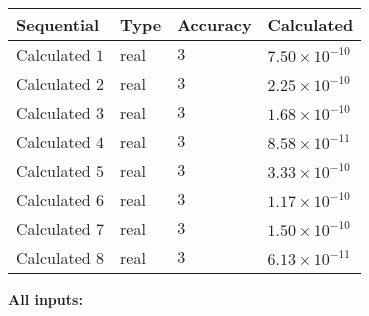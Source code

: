 \documentclass[12pt]{article}
\begin{document}
   
   
   
\noindent{}
   
   
  
  
\noindent\begin{tabular}{|l|l|l|l|}
\hline
 Sequential & Type & Accuracy & Calculated \\ 
\hline
 
 
  Calculated $           1$ & real & $           3 $ & 
 $ 7.50 \times 10^{-10} $ 
 \\  \hline  
 
 
  Calculated $           2$ & real & $           3 $ & 
 $ 2.25 \times 10^{-10} $ 
 \\  \hline  
 
 
  Calculated $           3$ & real & $           3 $ & 
 $ 1.68 \times 10^{-10} $ 
 \\  \hline  
 
 
  Calculated $           4$ & real & $           3 $ & 
 $ 8.58 \times 10^{-11} $ 
 \\  \hline  
 
 
  Calculated $           5$ & real & $           3 $ & 
 $ 3.33 \times 10^{-10} $ 
 \\  \hline  
 
 
  Calculated $           6$ & real & $           3 $ & 
 $ 1.17 \times 10^{-10} $ 
 \\  \hline  
 
 
  Calculated $           7$ & real & $           3 $ & 
 $ 1.50 \times 10^{-10} $ 
 \\  \hline  
 
 
  Calculated $           8$ & real & $           3 $ & 
 $ 6.13 \times 10^{-11} $ 
 \\  \hline  
 \end{tabular}
   
   
   
   
\noindent\vspace{0.1in}\hspace{-0.08in} {\textbf{\Large{All inputs: }}}
   
   
  
\end{document}
